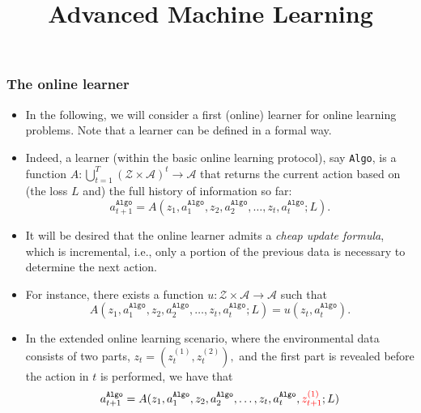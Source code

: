 \documentclass[11pt,compress,t,notes=noshow, xcolor=table]{beamer}
\title{Advanced Machine Learning}
\date{}
\renewcommand{\l}{L}
\newcommand{\Aspace}{\mathcal{A}}
\newcommand{\Zspace}{\mathcal{Z}}
\newcommand{\Algo}{\texttt{Algo}}
\begin{document}



\sloppy


\begin{frame}
	\frametitle{The online learner}
	\small
	\begin{itemize}
		\item In the following, we will consider a first (online) learner for   online learning problems. Note that a learner can be defined in a formal way.
		\item Indeed, a learner (within the basic online learning protocol), say \Algo, is a function $A: \bigcup_{t=1}^T (\Zspace \times \Aspace)^t \to \Aspace$ that returns the current action based on (the loss $\l$ and) the full history of information so far:
		$$	a_{t+1}^{\Algo} = A(z_1,a_1^{\Algo},z_2,a_2^{\Algo},\ldots,z_t,a_t^{\Algo};\l).		$$
		 \item It will be desired that the online learner admits a \emph{cheap update formula}, which is incremental, i.e., only a portion of the previous data is necessary to determine the next action.
		 \item  For instance, there exists a function $u:\Zspace \times \Aspace \to \Aspace$ such that 
		$$	A(z_1,a_1^{\Algo},z_2,a_2^{\Algo},\ldots,z_t,a_t^{\Algo};\l) = u(z_t,a_t^{\Algo}).$$
%		
		\item In the extended online learning scenario, where the environmental data consists of two parts, $z_t=(z_t^{(1)},z_t^{(2)}   ),$ and the {\color{red}first part is revealed before the action in $t$ is performed}, we have that
				$$	a_{t+1}^{\Algo} =  A(z_1,a_1^{\Algo},z_2,a_2^{\Algo},\ldots,z_t,a_t^{\Algo},{\color{red} z_{t+1}^{(1)}};\l)  		$$
				 
	\end{itemize}
\end{frame}
\end{document}

